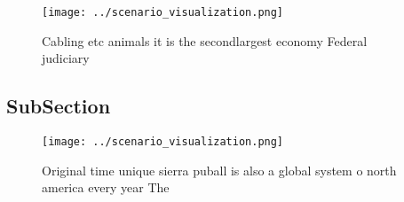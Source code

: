 \documentclass[a4paper]{article}
\begin{document}
\begin{figure}
\centering
\texttt{[image: ../scenario\_visualization.png]}
\caption{Cabling etc animals it is the secondlargest economy Federal judiciary
}
\end{figure}
 
\subsection{SubSection}

\begin{figure}
\centering
\texttt{[image: ../scenario\_visualization.png]}
\caption{Original time unique sierra puball is also a global system o north america every year The
}
\end{figure}
 
\end{document}
